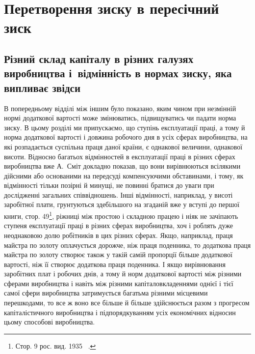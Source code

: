 
\chapter{Перетворення зиску в пересічний зиск}

\section{%
Різний склад капіталу в різних галузях виробництва
і~відмінність в нормах зиску, яка випливає звідси}
%

В попередньому відділі між іншим було показано, яким чином
при незмінній нормі додаткової вартості може змінюватись, підвищуватись
чи падати норма зиску. В цьому розділі ми припускаємо,
що ступінь експлуатації праці, а тому й норма додаткової
вартості і довжина робочого дня в усіх сферах виробництва,
на які розпадається суспільна праця даної країни, є однакової величини,
однакової висоти. Відносно багатьох відмінностей в експлуатації
праці в різних сферах виробництва вже А.~Сміт докладно показав,
що вони вирівнюються всілякими дійсними або основаними на передсуді
компенсуючими обставинами, і тому, як відмінності тільки
позірні й минущі, не повинні братися до уваги при дослідженні загальних
співвідношень. Інші відмінності, наприклад, у висоті заробітної
плати, грунтуються здебільшого на згаданій вже у вступі до
першої книги, стор. 49\footnote*{Стор. 9 рос. вид. 1935~ .}, ріжниці між простою і складною працею
і ніяк не зачіпають ступеня експлуатації праці в різних сферах
виробництва, хоч і роблять дуже неоднаковою долю робітників
в цих різних сферах. Якщо, наприклад, праця майстра по золоту
оплачується дорожче, ніж праця поденника, то додаткова праця
майстра по золоту створює також у такій самій пропорції більше
додаткової вартості, ніж її створює додаткова праця поденника.
І якщо вирівнювання заробітних плат і робочих днів, а тому й
норм додаткової вартості між різними сферами виробництва
і навіть між різними капіталовкладеннями однієї і тієї самої
сфери виробництва затримується багатьма різними місцевими
перешкодами, то все ж воно все більше й більше здійснюється
разом з прогресом капіталістичного виробництва і підпорядкуванням
усіх економічних відносин цьому способові виробництва.
\parbreak{}  %
